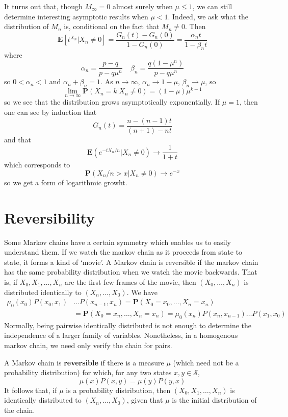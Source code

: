\begin{example}
    It turns out that, though $M_\infty = 0$ almost surely when $\mu \leq 1$, we can still determine interesting asymptotic results when $\mu < 1$. Indeed, we ask what the distribution of $M_n$ is, conditional on the fact that $M_n \neq 0$. Then
    \[ \mathbf{E}[t^{X_n}|X_n \neq 0] = \frac{G_n(t) - G_n(0)}{1 - G_n(0)} = \frac{\alpha_n t}{1 - \beta_n t} \]
    where
    \[ \alpha_n = \frac{p-q}{p-q\mu^n}\ \ \ \ \ \beta_n = \frac{q(1 - \mu^n)}{p - q\mu^n} \]
    so $0 < \alpha_n < 1$ and $\alpha_n + \beta_n = 1$. As $n \to \infty$, $\alpha_n \to 1 - \mu$, $\beta_n \to \mu$, so
    \[ \lim_{n \to \infty} \mathbf{P}(X_n = k|X_n \neq 0) = (1 - \mu) \mu^{k-1} \]
    so we see that the distribution grows asymptotically exponentially. If $\mu = 1$, then one can see by induction that
    \[ G_n(t) = \frac{n - (n-1)t}{(n + 1) - nt} \]
    and that
    \[ \mathbf{E}(e^{-tX_n/n}|X_n \neq 0) \to \frac{1}{1 + t} \]
    which corresponds to
    \[ \mathbf{P}(X_n/n > x | X_n \neq 0) \to e^{-x} \]
    so we get a form of logarithmic growht.
\end{example}

\chapter{Reversibility}

Some Markov chains have a certain symmetry which enables us to easily understand them. If we watch the markov chain as it proceeds from state to state, it forms a kind of `movie'. A Markov chain is reversible if the markov chain has the same probability distribution when we watch the movie backwards. That is, if $X_0, X_1, \dots, X_n$ are the first few frames of the movie, then $(X_0, \dots, X_n)$ is distributed identically to $(X_n, \dots, X_0)$. We have
%
\begin{align*}
    \mu_0(x_0) P(x_0,x_1)&\dots P(x_{n-1},x_n) = \mathbf{P}(X_0 = x_0, \dots, X_n = x_n)\\
    &= \mathbf{P}(X_0 = x_n, \dots, X_n = x_n) = \mu_0(x_n) P(x_n, x_{n-1}) \dots P(x_1,x_0)
\end{align*}
%
Normally, being pairwise identically distributed is not enough to determine the independence of a larger family of variables. Nonetheless, in a homogenous markov chain, we need only verify the chain for pairs.

\begin{definition}
    A Markov chain is {\bf reversible} if there is a measure $\mu$ (which need not be a probability distribution) for which, for any two states $x,y \in \mathcal{S}$,
    \[ \mu(x) P(x,y) = \mu(y) P(y,x) \]
    It follows that, if $\mu$ is a probability distribution, then $(X_0, X_1, \dots,X_n)$ is identically distributed to $(X_n, \dots, X_0)$, given that $\mu$ is the initial distribution of the chain.
\end{definition}

